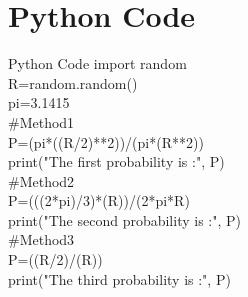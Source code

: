 \documentclass{beamer}
\begin{document}
\section{Python Code}
\begin{frame}{Python Code}
import random\\

R=random.random()\\
pi=3.1415\\
\#Method1\\
P=(pi*((R/2)**2))/(pi*(R**2))\\
print("The first probability is :", P)\\
\#Method2\\
P=(((2*pi)/3)*(R))/(2*pi*R)\\
print("The second probability is :", P)\\
\#Method3\\
P=((R/2)/(R))\\
print("The third probability is :", P)\\
\end{frame} 
\end{document}
